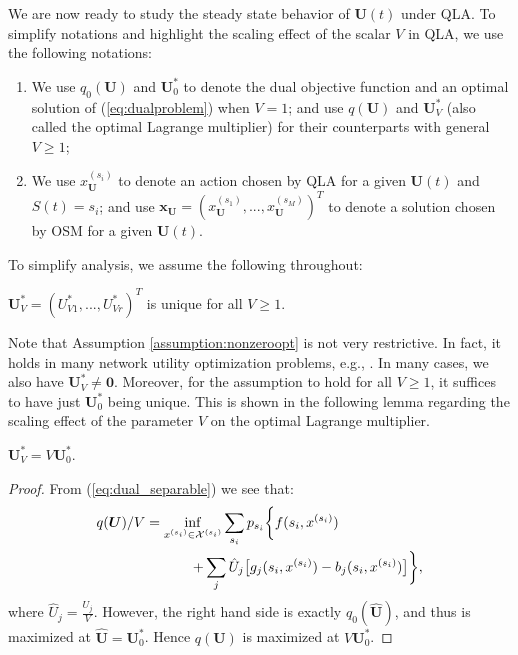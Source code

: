 \documentclass[journal]{IEEEtran}
\newcommand{\bv}[1]{{\boldsymbol{#1} }}
\newcommand{\script}[1]{{{\cal{#1} }}}
\begin{document}
We are now ready to study the steady state behavior of $\bv{U}(t)$ under QLA. To simplify notations and highlight the scaling effect of the scalar $V$ in QLA, we use the following notations:
\begin{enumerate}
\item We use $q_0(\bv{U})$ and $\bv{U}_0^*$ to denote the dual objective function and an optimal solution of (\ref{eq:dualproblem}) when $V=1$; and use $q(\bv{U})$ and $\bv{U}_V^*$ (also called the optimal Lagrange multiplier) for their counterparts with general $V\geq1$;
\item We use $x^{(s_i)}_{\bv{U}}$ to denote an action chosen by QLA for a given $\bv{U}(t)$ and  $S(t)=s_i$; and use $\bv{x}_{\bv{U}}=(x^{(s_1)}_{\bv{U}}, ..., x^{(s_M)}_{\bv{U}})^T$ to denote a solution chosen by OSM for a given $\bv{U}(t)$.
\end{enumerate}

To simplify analysis, we assume the following throughout:

\begin{assumption}\label{assumption:nonzeroopt}
$\bv{U}^*_V=(U^*_{V1}, ..., U^*_{Vr})^T$ is unique for all $V\geq1$. %
\end{assumption}
 

Note that Assumption \ref{assumption:nonzeroopt} is not very restrictive. In fact, it holds in many network utility optimization problems, e.g., \cite{eryilmaz_qbsc_ton07}. In many cases, we also have $\bv{U}^*_V\neq\bv{0}$. Moreover, for the assumption to hold for all $V\geq1$, it suffices to have just $\bv{U}^*_0$ being unique. This is shown in the following lemma regarding the scaling effect of the parameter $V$ on the optimal Lagrange multiplier. 
 
\begin{lemma}\label{lemma:scalingeffectV}
$\bv{U}^*_V=V\bv{U}^*_0.$
\end{lemma}
\begin{proof} %
From (\ref{eq:dual_separable}) we see that:
\begin{eqnarray*}
q(\bv{U})/V=\inf_{x^{(s_i)}\in \script{X}^{(s_i)}}\sum_{s_i}p_{s_i}\bigg\{f(s_i, x^{(s_i)})\qquad\qquad\qquad\\
+\sum_j\hat{U}_j\big[g_{j}(s_i, x^{(s_i)})- b_{j}(s_i, x^{(s_i)})\big]\bigg\},
\end{eqnarray*}
where $\hat{U}_j=\frac{U_j}{V}$. However, the right hand side is exactly $q_0(\hat{\bv{U}})$, and thus  is maximized at $\hat{\bv{U}}=\bv{U}_0^*$. Hence $q(\bv{U})$ is maximized at $V\bv{U}_0^*$.
\end{proof}
 
\end{document}
